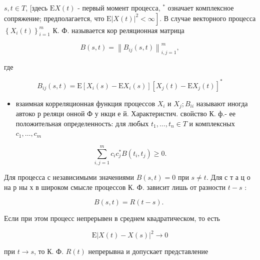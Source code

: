 \documentclass[10pt]{article}
\begin{document}
$s, t \in T$, [здесь $\mathrm{E} X(t)$ - первый момент процесса, ${ }^{*}$ означает комплексное сопряжение; предполагается, что $\left.\mathrm{E}|X(t)|^{2}<\infty\right]$. В случае векторного процесса $\left\{X_{i}(t)\right\}_{i=1}^{m}$ К. Ф. называется кор реляционная матрица



\[

B(s, t)=\left\|B_{i j}(s, t)\right\|_{i, j=1}^{m},

\]



где



\[

B_{i j}(s, t)=\mathrm{E}\left[X_{i}(s)-\mathrm{E} X_{i}(s)\right]\left[X_{j}(t)-\mathrm{E} X_{j}(t)\right]^{*}

\]



\begin{itemize}

  \item взаимная корреляционная функция процессов $X_{i}$ и $X_{j} ; B_{i i}$ называют иногда автоко р реляци онной Ф у нкци е й. Характеристич. свойство К. ф.- ее положительная определенность: для любых $t_{1}, \ldots, t_{n} \in T$ и комплексных $c_{1}, \ldots, c_{m}$

\end{itemize}



\[

\sum_{i, j=1}^{m} c_{i} c_{j}^{*} B\left(t_{i}, t_{j}\right) \geqslant 0 .

\]



Для процесса с независимыми значениями $B(s, t)=0$ при $s \neq t$. Для с т а ц о на р ны х в широком смысле процессов К. Ф. зависит лишь от разности $t-s$ :



\[

B(s, t)=R(t-s) \text {. }

\]



Если при этом процесс непрерывен в среднем квадратическом, то есть



\[

\mathrm{E}|X(t)-X(s)|^{2} \rightarrow 0

\]



при $t \rightarrow s$, то К. Ф. $R(t)$ непрерывна и допускает представление
\end{document}
